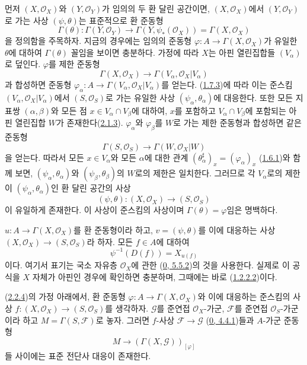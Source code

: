 먼저 $(X,\mathscr{O}_X)$와 $(Y,\mathscr{O}_Y)$가 임의의 두 환 달린
공간이면, $(X,\mathscr{O}_X)$에서 $(Y,\mathscr{O}_Y)$로 가는 사상
$(\psi,\theta)$는 표준적으로 환 준동형
\[
  \Gamma(\theta):\Gamma(Y,\mathscr{O}_Y)\longrightarrow
  \Gamma(Y,\psi_*(\mathscr{O}_X))=\Gamma(X,\mathscr{O}_X)
\]
을 정의함을 주목하자. 지금의 경우에는 임의의 준동형
$\varphi:A\to\Gamma(X,\mathscr{O}_X)$가 유일한 $\theta$에 대하여
$\Gamma(\theta)$ 꼴임을 보이면 충분하다. 가정에 따라 $X$는 아핀
열린집합들 $(V_\alpha)$로 덮인다. $\varphi$를 제한 준동형
\[
  \Gamma(X,\mathscr{O}_X)\longrightarrow
  \Gamma(V_\alpha,\mathscr{O}_X|V_\alpha)
\]
과 합성하면 준동형
$\varphi_\alpha:A\to\Gamma(V_\alpha,\mathscr{O}_X|V_\alpha)$를 얻는다.
(\hyperref[I.1.7.3-ko]{1.7.3})에 따라 이는 준스킴
$(V_\alpha,\mathscr{O}_X|V_\alpha)$에서 $(S,\mathscr{O}_S)$로 가는
유일한 사상 $(\psi_\alpha,\theta_\alpha)$에 대응한다. 또한 모든 지표쌍
$(\alpha,\beta)$와 모든 점 $x\in V_\alpha\cap V_\beta$에 대하여,
$x$를 포함하고 $V_\alpha\cap V_\beta$에 포함되는 아핀 열린집합 $W$가
존재한다(\hyperref[I.2.1.3-ko]{2.1.3}). $\varphi_\alpha$와
$\varphi_\beta$를 $W$로 가는 제한 준동형과 합성하면 같은 준동형
\[
  \Gamma(S,\mathscr{O}_S)\longrightarrow
  \Gamma(W,\mathscr{O}_X|W)
\]
을 얻는다. 따라서 모든 $x\in V_\alpha$와 모든 $\alpha$에 대한 관계
$(\theta_\alpha^\sharp)_x=(\varphi_\alpha)_x$
(\hyperref[I.1.6.1-ko]{1.6.1})와 함께 보면,
$(\psi_\alpha,\theta_\alpha)$와 $(\psi_\beta,\theta_\beta)$의 $W$로의
제한은 일치한다. 그러므로 각 $V_\alpha$로의 제한이
$(\psi_\alpha,\theta_\alpha)$인 환 달린 공간의 사상
\[
  (\psi,\theta):(X,\mathscr{O}_X)\longrightarrow(S,\mathscr{O}_S)
\]
이 유일하게 존재한다. 이 사상이 준스킴의 사상이며
$\Gamma(\theta)=\varphi$임은 명백하다.

$u:A\to\Gamma(X,\mathscr{O}_X)$를 환 준동형이라 하고,
$v=(\psi,\theta)$를 이에 대응하는 사상
$(X,\mathscr{O}_X)\to(S,\mathscr{O}_S)$라 하자. 모든 $f\in A$에 대하여
\begin{equation}
  \psi^{-1}(D(f))=X_{u(f)}
  \tag{2.2.4.1}\label{I.2.2.4.1-ko}
\end{equation}
이다. 여기서 표기는 국소 자유층 $\mathscr{O}_X$에 관한
(\hyperref[0.5.5.2-ko]{0, 5.5.2})의 것을 사용한다. 실제로 이 공식을
$X$ 자체가 아핀인 경우에 확인하면 충분하며, 그때에는 바로
(\hyperref[I.1.2.2.2-ko]{1.2.2.2})이다.

\begin{proposition}[2.2.5]
\label{I.2.2.5-ko}
(\hyperref[I.2.2.4-ko]{2.2.4})의 가정 아래에서, 환 준동형
$\varphi:A\to\Gamma(X,\mathscr{O}_X)$와 이에 대응하는 준스킴의 사상
$f:(X,\mathscr{O}_X)\to(S,\mathscr{O}_S)$를 생각하자.
$\mathscr{G}$를 준연접 $\mathscr{O}_X$-가군,
$\mathscr{F}$를 준연접 $\mathscr{O}_S$-가군이라 하고
$M=\Gamma(S,\mathscr{F})$로 놓자.
그러면 $f$-사상
$\mathscr{F}\to\mathscr{G}$
(\hyperref[0.4.4.1-ko]{0, 4.4.1})들과 $A$-가군 준동형
\[
  M\longrightarrow(\Gamma(X,\mathscr{G}))_{[\varphi]}
\]
들 사이에는 표준 전단사 대응이 존재한다.
\end{proposition}

